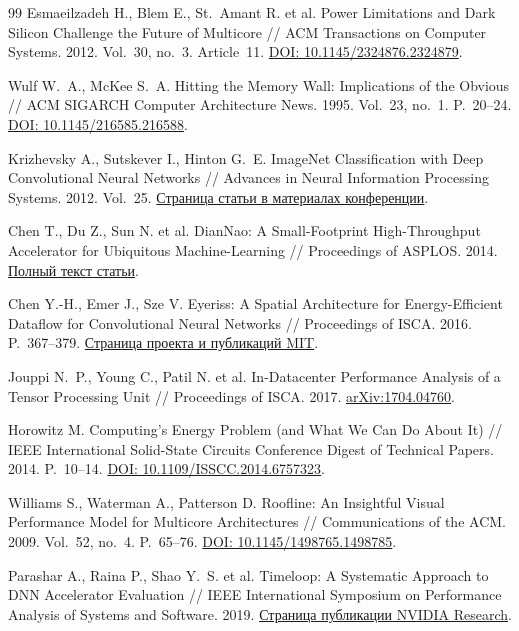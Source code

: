 \begin{thebibliography}{99}
Esmaeilzadeh H., Blem E., St.~Amant R. et al.
Power Limitations and Dark Silicon Challenge the Future of Multicore //
ACM Transactions on Computer Systems. 2012. Vol.~30, no.~3. Article~11.
\href{https://doi.org/10.1145/2324876.2324879}{DOI: 10.1145/2324876.2324879}.

Wulf W.~A., McKee S.~A.
Hitting the Memory Wall: Implications of the Obvious //
ACM SIGARCH Computer Architecture News. 1995. Vol.~23, no.~1. P.~20--24.
\href{https://doi.org/10.1145/216585.216588}{DOI: 10.1145/216585.216588}.

Krizhevsky A., Sutskever I., Hinton G.~E.
ImageNet Classification with Deep Convolutional Neural Networks //
Advances in Neural Information Processing Systems. 2012. Vol.~25.
\href{https://proceedings.neurips.cc/paper_files/paper/2012/hash/c399862d3b9d6b76c8436e924a68c45b-Abstract.html}{Страница статьи в материалах конференции}.

Chen T., Du Z., Sun N. et al.
DianNao: A Small-Footprint High-Throughput Accelerator for Ubiquitous
Machine-Learning // Proceedings of ASPLOS. 2014.
\href{https://users.cs.duke.edu/~lkw34/papers/diannao-asplos2014.pdf}{Полный текст статьи}.

Chen Y.-H., Emer J., Sze V.
Eyeriss: A Spatial Architecture for Energy-Efficient Dataflow for
Convolutional Neural Networks // Proceedings of ISCA. 2016. P.~367--379.
\href{https://eyeriss.mit.edu/}{Страница проекта и публикаций MIT}.

Jouppi N.~P., Young C., Patil N. et al.
In-Datacenter Performance Analysis of a Tensor Processing Unit //
Proceedings of ISCA. 2017.
\href{https://arxiv.org/abs/1704.04760}{arXiv:1704.04760}.

Horowitz M.
Computing's Energy Problem (and What We Can Do About It) //
IEEE International Solid-State Circuits Conference Digest of Technical Papers.
2014. P.~10--14.
\href{https://doi.org/10.1109/ISSCC.2014.6757323}{DOI: 10.1109/ISSCC.2014.6757323}.

Williams S., Waterman A., Patterson D.
Roofline: An Insightful Visual Performance Model for Multicore Architectures //
Communications of the ACM. 2009. Vol.~52, no.~4. P.~65--76.
\href{https://doi.org/10.1145/1498765.1498785}{DOI: 10.1145/1498765.1498785}.

Parashar A., Raina P., Shao Y.~S. et al.
Timeloop: A Systematic Approach to DNN Accelerator Evaluation //
IEEE International Symposium on Performance Analysis of Systems and Software.
2019.
\href{https://research.nvidia.com/publication/2019-03_timeloop-systematic-approach-dnn-accelerator-evaluation}{Страница публикации NVIDIA Research}.


\end{thebibliography}
